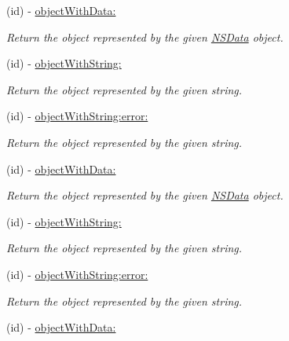 \begin{DoxyCompactItemize}
\item 
(id) -\/ \hyperlink{interface_s_b_json_parser_a66d7be591cdf0d9ee85c21c863ef5cbf}{object\-With\-Data\-:}
\begin{DoxyCompactList}\small\item\em \-Return the object represented by the given \hyperlink{class_n_s_data}{\-N\-S\-Data} object. \end{DoxyCompactList}\item 
(id) -\/ \hyperlink{interface_s_b_json_parser_a1ec40b986576044d58d30172b141c74c}{object\-With\-String\-:}
\begin{DoxyCompactList}\small\item\em \-Return the object represented by the given string. \end{DoxyCompactList}\item 
(id) -\/ \hyperlink{interface_s_b_json_parser_a7a7fff47f41a08fa0defc4f628846e15}{object\-With\-String\-:error\-:}
\begin{DoxyCompactList}\small\item\em \-Return the object represented by the given string. \end{DoxyCompactList}\item 
(id) -\/ \hyperlink{interface_s_b_json_parser_a66d7be591cdf0d9ee85c21c863ef5cbf}{object\-With\-Data\-:}
\begin{DoxyCompactList}\small\item\em \-Return the object represented by the given \hyperlink{class_n_s_data}{\-N\-S\-Data} object. \end{DoxyCompactList}\item 
(id) -\/ \hyperlink{interface_s_b_json_parser_a1ec40b986576044d58d30172b141c74c}{object\-With\-String\-:}
\begin{DoxyCompactList}\small\item\em \-Return the object represented by the given string. \end{DoxyCompactList}\item 
(id) -\/ \hyperlink{interface_s_b_json_parser_a7a7fff47f41a08fa0defc4f628846e15}{object\-With\-String\-:error\-:}
\begin{DoxyCompactList}\small\item\em \-Return the object represented by the given string. \end{DoxyCompactList}\item 
(id) -\/ \hyperlink{interface_s_b_json_parser_a66d7be591cdf0d9ee85c21c863ef5cbf}{object\-With\-Data\-:}

\end{DoxyCompactItemize}
